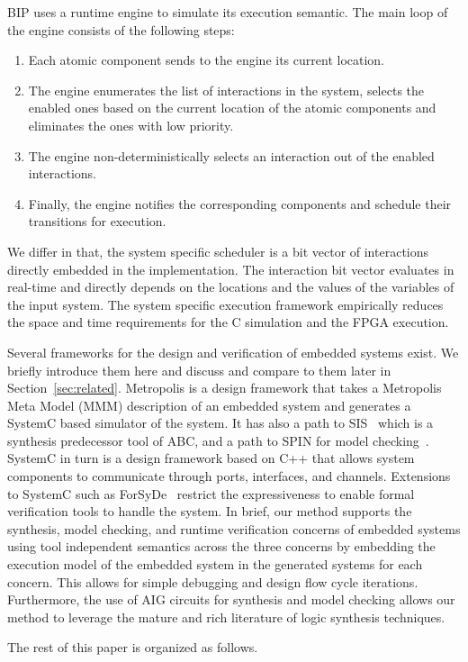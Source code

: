 BIP uses a runtime engine to simulate its execution semantic. 
The main loop of the engine consists of the following steps:
\begin{enumerate}
\item Each atomic component sends to the engine its current location.
\item The engine enumerates the list of interactions in the system, 
  selects the enabled ones based on the current location of the atomic 
  components and eliminates the ones with low priority.
\item The engine non-deterministically selects an interaction out of the enabled interactions.
\item Finally, the engine notifies the corresponding components and schedule their transitions for execution. 
\end{enumerate}
We differ in that, the system specific scheduler is a bit vector of interactions directly embedded in the implementation. 
The interaction bit vector evaluates in real-time and directly depends on the locations and the values of the variables of the input system. 
The system specific execution framework empirically reduces the space and time requirements for the C simulation and the FPGA execution. 

Several frameworks for the design and verification of embedded systems exist. 
We briefly introduce them here and discuss and compare to them later in 
Section~\ref{sec:related}.
Metropolis\cite{metropolis1,metropolis2} is a design framework that
takes a Metropolis Meta Model (MMM) description of an embedded system 
and generates a SystemC\cite{systemc} based simulator of the system.
It has also a path to SIS~\cite{brayton92sis} which is a synthesis predecessor tool 
of ABC, and a path to SPIN for model checking~\cite{HolzSpin97}. 
SystemC\cite{systemc} in turn is a design framework based on C++ that allows
system components to communicate through ports, interfaces, and channels.
Extensions to SystemC such as ForSyDe~\cite{SanderJ04} restrict the 
expressiveness to enable formal verification tools to handle the system. 
In brief, our method supports the synthesis, model checking, and runtime verification 
concerns of embedded systems using tool independent semantics across the three concerns
by embedding the execution model of the embedded system in the generated systems 
for each concern. 
This allows for simple debugging and design flow cycle iterations. Furthermore, 
the use of AIG circuits for synthesis and model checking allows our method to leverage
the mature and rich literature of logic synthesis techniques. 

The rest of this paper is organized as follows.
